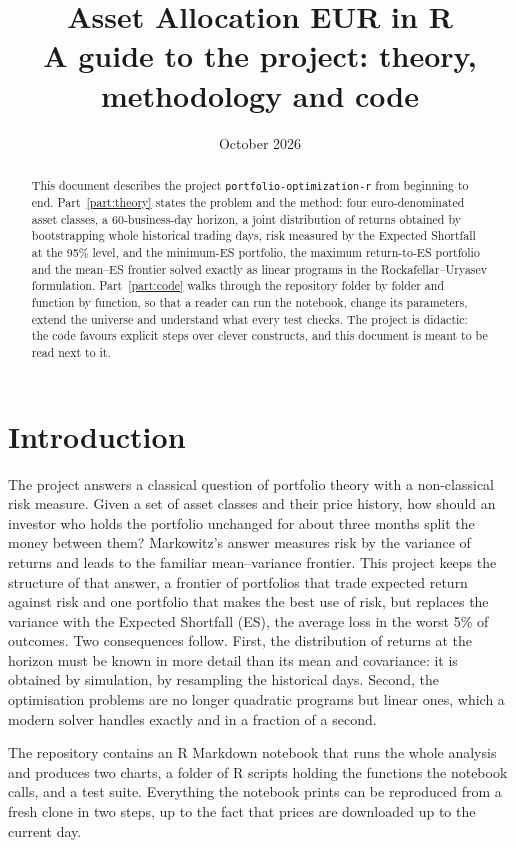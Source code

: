 \documentclass[11pt,a4paper]{article}
\title{Asset Allocation EUR in R\\
       \large A guide to the project: theory, methodology and code}
\author{}
\date{October 2026}
\newcommand{\code}[1]{\texttt{#1}}
\theoremstyle{plain}
\theoremstyle{remark}
\begin{document}
\maketitle

\begin{abstract}
This document describes the project \code{portfolio-optimization-r} from
beginning to end. Part~\ref{part:theory} states the problem and the method:
four euro-denominated asset classes, a 60-business-day horizon, a joint
distribution of returns obtained by bootstrapping whole historical trading
days, risk measured by the Expected Shortfall at the 95\% level, and the
minimum-ES portfolio, the maximum return-to-ES portfolio and the mean--ES
frontier solved exactly as linear programs in the Rockafellar--Uryasev
formulation. Part~\ref{part:code} walks through the repository folder by
folder and function by function, so that a reader can run the notebook,
change its parameters, extend the universe and understand what every test
checks. The project is didactic: the code favours explicit steps over
clever constructs, and this document is meant to be read next to it.
\end{abstract}

\tableofcontents
\clearpage

\section{Introduction}

The project answers a classical question of portfolio theory with a
non-classical risk measure. Given a set of asset classes and their price
history, how should an investor who holds the portfolio unchanged for about
three months split the money between them? Markowitz's answer measures risk
by the variance of returns and leads to the familiar mean--variance frontier.
This project keeps the structure of that answer, a frontier of portfolios
that trade expected return against risk and one portfolio that makes the
best use of risk, but replaces the variance with the Expected Shortfall
(ES), the average loss in the worst 5\% of outcomes. Two consequences
follow. First, the distribution of returns at the horizon must be known in
more detail than its mean and covariance: it is obtained by simulation, by
resampling the historical days. Second, the optimisation problems are no
longer quadratic programs but linear ones, which a modern solver handles
exactly and in a fraction of a second.

The repository contains an R Markdown notebook that runs the whole analysis
and produces two charts, a folder of R scripts holding the functions the
notebook calls, and a test suite. Everything the notebook prints can be
reproduced from a fresh clone in two steps, up to the fact that prices
are downloaded up to the current day.
\end{document}
